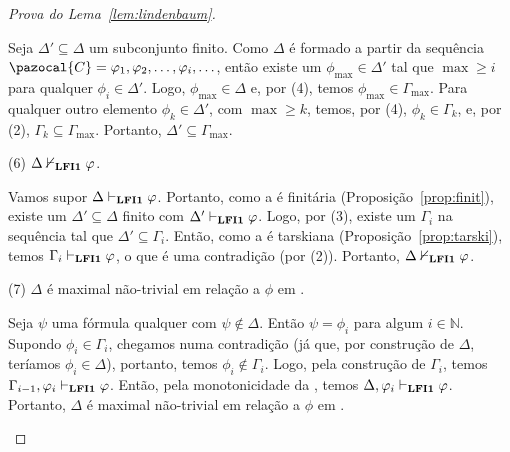 \begin{proof}[Prova do Lema~\ref{lem:lindenbaum}]
\begin{adjustwidth}{1cm}{}
            \begin{adjustwidth}{1cm}{}

                Seja $\Delta' \subseteq \Delta$ um subconjunto finito. Como $\Delta$ é formado a partir da sequência $\pazocal{C} = \phi_1, \phi_2, \ldots, \phi_i, \ldots$, então existe um $\phi_{\max} \in \Delta'$ tal que $\max \geq i$ para qualquer $\phi_i \in \Delta'$. Logo, $\phi_{\max} \in \Delta$ e, por (4), temos $\phi_{\max} \in \Gamma_{\max}$. Para qualquer outro elemento $\phi_k \in \Delta'$, com $\max \geq k$, temos, por (4), $\phi_k \in \Gamma_k$, e, por (2), $\Gamma_k \subseteq \Gamma_{\max}$. Portanto, $\Delta' \subseteq \Gamma_{\max}$.

            \end{adjustwidth}


            \noindent(6) $\Delta \nvdash_{{\normalfont\textbf{LFI1}}{}} \varphi$.

            \begin{adjustwidth}{1cm}{}
                Vamos supor $\Delta \vdash_{{\normalfont\textbf{LFI1}}{}} \varphi$. Portanto, como a \lfium{} é finitária (Proposição~\ref{prop:finit}), existe um $\Delta' \subseteq \Delta$ finito com $\Delta' \vdash_{{\normalfont\textbf{LFI1}}{}} \varphi$. Logo, por (3), existe um $\Gamma_i$ na sequência tal que $\Delta' \subseteq \Gamma_i$. Então, como a \lfium{} é tarskiana (Proposição~\ref{prop:tarski}), temos $\Gamma_i \vdash_{{\normalfont\textbf{LFI1}}{}} \varphi$, o que é uma contradição (por (2)). Portanto, $\Delta \nvdash_{{\normalfont\textbf{LFI1}}{}} \varphi$.
            \end{adjustwidth}

            \noindent(7) $\Delta$ é maximal não-trivial em relação a $\phi$ em \lfium{}.
            
            \begin{adjustwidth}{1cm}{}
                Seja $\psi$ uma fórmula qualquer com $\psi \not \in \Delta$. Então $\psi = \phi_i$ para algum $i \in \mathbb{N}$. Supondo $\phi_i \in \Gamma_i$, chegamos numa contradição (já que, por construção de $\Delta$, teríamos $\phi_i \in \Delta$), portanto, temos $\phi_i \not \in \Gamma_i$. Logo, pela construção de $\Gamma_i$, temos $\Gamma_{i - 1}, \varphi_i \vdash_{{\normalfont\textbf{LFI1}}{}} \varphi$. Então, pela monotonicidade da \lfium{}, temos $\Delta, \varphi_i \vdash_{{\normalfont\textbf{LFI1}}{}} \varphi$. Portanto, $\Delta$ é maximal não-trivial em relação a $\phi$ em \lfium{}.

            \end{adjustwidth}


        \end{adjustwidth}
            
            
        \end{proof}
        
